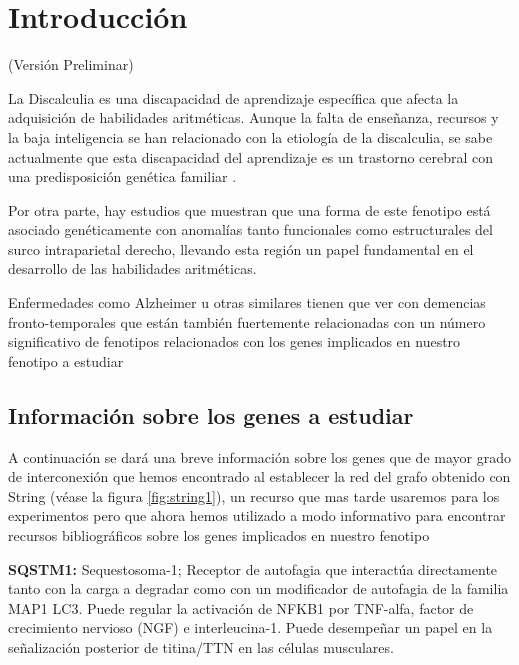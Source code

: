 \section{Introducción}

(Versión Preliminar)

La Discalculia es una discapacidad de aprendizaje específica que afecta la adquisición de habilidades aritméticas. Aunque la falta de  enseñanza, recursos y la baja inteligencia se han relacionado con la etiología de la discalculia, se sabe actualmente que esta discapacidad del aprendizaje es un trastorno cerebral con una predisposición genética familiar \cite{Molko2003}.

\hfill

Por otra parte, hay estudios \cite{Molko2003,Shalev2001} que muestran que una forma de este fenotipo está asociado genéticamente con anomalías tanto funcionales como estructurales del surco intraparietal derecho, llevando esta región un papel fundamental en el desarrollo de las habilidades aritméticas.

\hfill

Enfermedades como Alzheimer u otras similares tienen que ver con demencias fronto-temporales \cite{Walterfang2014} que están también fuertemente relacionadas con un número significativo de fenotipos relacionados con los genes implicados en nuestro fenotipo a estudiar



\hfill

\subsection{Información sobre los genes a estudiar}


A continuación se dará una breve información sobre los genes que de mayor grado de interconexión que hemos encontrado al establecer la red del grafo obtenido con String (véase la figura \ref{fig:string1}), un recurso que mas tarde usaremos para los experimentos pero que ahora hemos utilizado a modo informativo para encontrar recursos bibliográficos sobre los genes implicados en nuestro fenotipo

\hfill

\textbf{SQSTM1\cite{SQSTM1}:} Sequestosoma-1; Receptor de autofagia que interactúa directamente tanto con la carga a degradar como con un modificador de autofagia de la familia MAP1 LC3. Puede regular la activación de NFKB1 por TNF-alfa, factor de crecimiento nervioso (NGF) e interleucina-1. Puede desempeñar un papel en la señalización posterior de titina/TTN en las células musculares.


